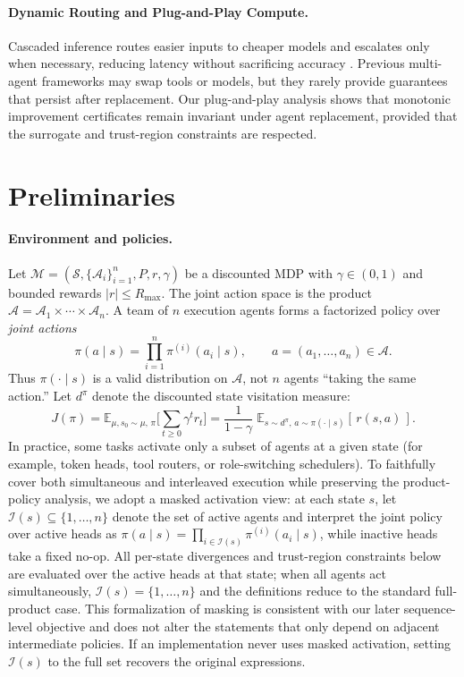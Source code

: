 \documentclass[sigconf]{aamas}
\newcommand{\E}{\mathbb{E}}
\begin{document}
\paragraph{Dynamic Routing and Plug-and-Play Compute.}
Cascaded inference routes easier inputs to cheaper models and escalates only when necessary, reducing latency without sacrificing accuracy \citep{leviathan2023fast}.
Previous multi-agent frameworks may swap tools or models, but they rarely provide guarantees that persist after replacement. Our plug-and-play analysis shows that monotonic improvement certificates remain invariant under agent replacement, provided that the surrogate and trust-region constraints are respected.

\section{Preliminaries}
\label{sec:prelim}

\paragraph{Environment and policies.}
Let $\mathcal{M}=(\mathcal{S},\{\mathcal{A}_i\}_{i=1}^{n},P,r,\gamma)$ be a discounted MDP with $\gamma\in(0,1)$ and bounded rewards $|r|\le R_{\max}$. The joint action space is the product $\mathcal{A}=\mathcal{A}_1\times\cdots\times\mathcal{A}_n$. A team of $n$ execution agents forms a factorized policy over \emph{joint actions}
\[
\pi(a\mid s)=\prod_{i=1}^{n}\pi^{(i)}(a_i\mid s),\qquad a=(a_1,\ldots,a_n)\in\mathcal{A}.
\]
Thus $\pi(\cdot\mid s)$ is a valid distribution on $\mathcal{A}$, not $n$ agents “taking the same action.” Let $d^{\pi}$ denote the discounted state visitation measure:
\[
J(\pi)=\E_{\mu,s_0\sim\mu,\,\pi}\Big[\sum_{t\ge 0}\gamma^{t}r_t\Big]
=\frac{1}{1-\gamma}\;\E_{s\sim d^{\pi},\,a\sim\pi(\cdot\mid s)}[\,r(s,a)\,].
\]
In practice, some tasks activate only a subset of agents at a given state (for example, token heads, tool routers, or role-switching schedulers). To faithfully cover both simultaneous and interleaved execution while preserving the product-policy analysis, we adopt a masked activation view: at each state $s$, let $\mathcal{I}(s)\subseteq\{1,\ldots,n\}$ denote the set of active agents and interpret the joint policy over active heads as $\pi(a\mid s)=\prod_{i\in\mathcal{I}(s)}\pi^{(i)}(a_i\mid s)$, while inactive heads take a fixed no-op. All per-state divergences and trust-region constraints below are evaluated over the active heads at that state; when all agents act simultaneously, $\mathcal{I}(s)=\{1,\ldots,n\}$ and the definitions reduce to the standard full-product case. This formalization of masking is consistent with our later sequence-level objective and does not alter the statements that only depend on adjacent intermediate policies. If an implementation never uses masked activation, setting $\mathcal{I}(s)$ to the full set recovers the original expressions.
\end{document}
